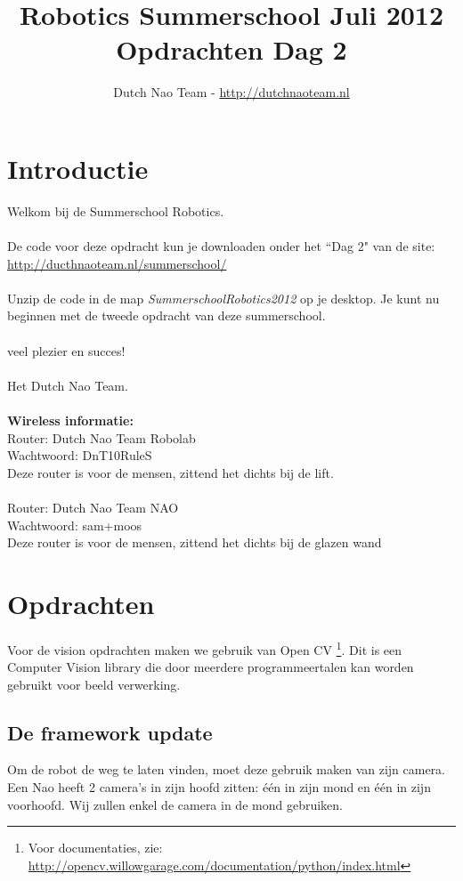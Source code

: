 \documentclass[a4paper]{article}
\title{\textbf{Robotics Summerschool Juli 2012} \\ Opdrachten Dag 2}
\author{Dutch Nao Team - \url{http://dutchnaoteam.nl}}
\date{}
\begin{document}
\maketitle

\section{Introductie}
Welkom bij de Summerschool Robotics.\\
\\
De code voor deze opdracht kun je downloaden onder het ``Dag 2" van de site:\\ 
\url{http://ducthnaoteam.nl/summerschool/}\\
\\
Unzip de code in de map \textit{SummerschoolRobotics2012} op je desktop. Je kunt nu beginnen met de tweede opdracht van deze summerschool. \\
\\
veel plezier en succes!\\
\\
Het Dutch Nao Team.\\
\\
\textbf{Wireless informatie:}\\
Router:  Dutch Nao Team Robolab\\
Wachtwoord: DnT10RuleS\\
Deze router is voor de mensen, zittend het dichts bij de lift.\\
\\
Router:  Dutch Nao Team NAO\\
Wachtwoord: sam+moos\\
Deze router is voor de mensen, zittend het dichts bij de glazen wand

\tableofcontents

\newpage

\section{Opdrachten}
Voor de vision opdrachten maken we gebruik van Open CV \footnote{Voor documentaties, zie: \\ \url{http://opencv.willowgarage.com/documentation/python/index.html}}. Dit is een Computer Vision library die door meerdere programmeertalen kan worden gebruikt voor beeld verwerking.

\subsection{De framework update}
Om de robot de weg te laten vinden, moet deze gebruik maken van zijn camera. Een Nao heeft 2 camera's in zijn hoofd zitten: \'e\'en in zijn mond en \'e\'en in zijn voorhoofd. Wij zullen enkel de camera in de mond gebruiken.
\end{document}
